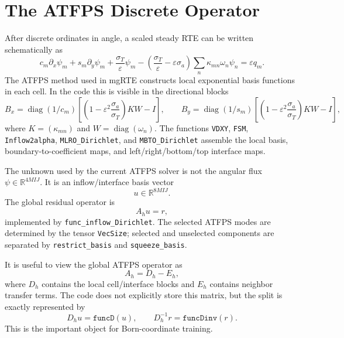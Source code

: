 \documentclass[11pt]{article}
\newcommand{\R}{\mathbb{R}}
\begin{document}
\section{The ATFPS Discrete Operator}

After discrete ordinates in angle, a scaled steady RTE can be written
schematically as
\begin{equation}
  c_m \partial_x \psi_m
  + s_m \partial_y \psi_m
  + \frac{\sigma_T}{\varepsilon}\psi_m
  - \left(\frac{\sigma_T}{\varepsilon}
          - \varepsilon\sigma_a\right)
    \sum_n \kappa_{mn}\omega_n \psi_n
  = \varepsilon q_m.
  \label{eq:dom-rte}
\end{equation}
The ATFPS method used in mgRTE constructs local exponential basis functions in
each cell.  In the code this is visible in the directional blocks
\begin{equation}
  B_x =
  \operatorname{diag}(1/c_m)
  \left[
    \left(1-\varepsilon^2\frac{\sigma_a}{\sigma_T}\right)K W
    - I
  \right],
  \qquad
  B_y =
  \operatorname{diag}(1/s_m)
  \left[
    \left(1-\varepsilon^2\frac{\sigma_a}{\sigma_T}\right)K W
    - I
  \right],
  \label{eq:directional-blocks}
\end{equation}
where \(K=(\kappa_{mn})\) and \(W=\operatorname{diag}(\omega_n)\).  The
functions \texttt{VDXY}, \texttt{FSM}, \texttt{Inflow2alpha},
\texttt{MLRO\_Dirichlet}, and \texttt{MBTO\_Dirichlet} assemble the local
basis, boundary-to-coefficient maps, and left/right/bottom/top interface maps.

The unknown used by the current ATFPS solver is not the angular flux
\(\psi\in\R^{4M I J}\).  It is an inflow/interface basis vector
\[
  u \in \R^{8M I J}.
\]
The global residual operator is
\begin{equation}
  A_h u = r,
  \label{eq:atfps-operator}
\end{equation}
implemented by \texttt{func\_inflow\_Dirichlet}.  The selected ATFPS modes are
determined by the tensor \texttt{VecSize}; selected and unselected components
are separated by \texttt{restrict\_basis} and \texttt{squeeze\_basis}.

It is useful to view the global ATFPS operator as
\begin{equation}
  A_h = D_h - E_h,
  \label{eq:block-splitting}
\end{equation}
where \(D_h\) contains the local cell/interface blocks and \(E_h\) contains
neighbor transfer terms.  The code does not explicitly store this matrix, but
the split is exactly represented by
\[
  D_h u = \texttt{funcD}(u),
  \qquad
  D_h^{-1}r = \texttt{funcDinv}(r).
\]
This is the important object for Born-coordinate training.
\end{document}
